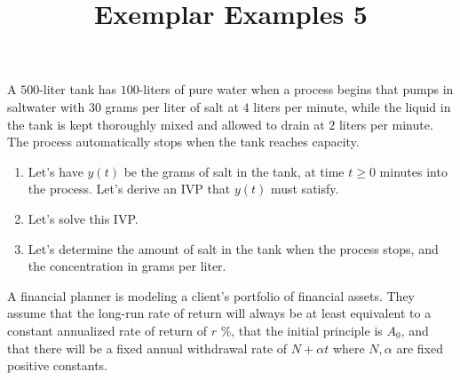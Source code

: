 \documentclass{ximera}
\begin{document}
\begin{abstract}
 \end{abstract}

    \title{Exemplar Examples 5}
    
    \maketitle

A $500$-liter tank has $100$-liters of pure water when a process begins that pumps in saltwater with $30$ grams per liter of salt at $4$ liters per minute, while the liquid in the tank is kept thoroughly mixed and allowed to drain at $2$ liters per minute.  The process automatically stops when the tank reaches capacity.


\begin{enumerate}

\item Let's have $y(t)$ be the grams of salt in the tank, at time $t\geq 0$ minutes into the process.   Let's derive an IVP that $y(t)$ must satisfy.    



\vfill

\item Let's solve this IVP.

\vfill
\vfill







\item Let's determine the amount of salt in the tank when the process stops, and the concentration in grams per liter.



\vfill

\end{enumerate}



\newpage


A financial planner is modeling a client's portfolio of financial assets.  They assume that the long-run rate of return will always be at least equivalent to a constant annualized rate of return of $r$ \%, that the initial principle is $A_0$, and that there will be a fixed annual withdrawal rate of $N+\alpha t$ where $N,\alpha$ are fixed positive constants.
\end{document}
